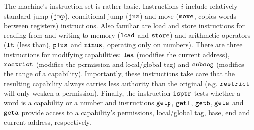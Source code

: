 \documentclass[format=acmsmall, review=true, screen=true]{acmart}
\newcommand{\zinstr}[1]{\mathtt{#1}}
\newcommand{\oneinstr}[2]{
  \ifthenelse{\equal{#2}{}}
  {\zinstr{#1}}
  {\zinstr{#1} \; #2}
}
\newcommand{\jmp}[1]{\oneinstr{jmp}{#1}}
\newcommand{\twoinstr}[3]{
  \ifthenelse{\equal{#2#3}{}}
  {\zinstr{#1}}
  {\zinstr{#1} \; #2 \; #3}
}
\newcommand{\restricttwo}[2]{\twoinstr{restrict}{#1}{#2}}
\newcommand{\jnz}[2]{\twoinstr{jnz}{#1}{#2}}
\newcommand{\isptr}[2]{\twoinstr{isptr}{#1}{#2}}
\newcommand{\geta}[2]{\twoinstr{geta}{#1}{#2}}
\newcommand{\getb}[2]{\twoinstr{getb}{#1}{#2}}
\newcommand{\gete}[2]{\twoinstr{gete}{#1}{#2}}
\newcommand{\getp}[2]{\twoinstr{getp}{#1}{#2}}
\newcommand{\getl}[2]{\twoinstr{getl}{#1}{#2}}
\newcommand{\move}[2]{\twoinstr{move}{#1}{#2}}
\newcommand{\store}[2]{\twoinstr{store}{#1}{#2}}
\newcommand{\load}[2]{\twoinstr{load}{#1}{#2}}
\newcommand{\lea}[2]{\twoinstr{lea}{#1}{#2}}
\newcommand{\threeinstr}[4]{
  \ifthenelse{\equal{#2#3#4}{}}
  {\zinstr{#1}}
  {\zinstr{#1} \; #2 \; #3 \; #4}
}
\newcommand{\subseg}[3]{\threeinstr{subseg}{#1}{#2}{#3}}
\newcommand{\plus}[3]{\threeinstr{plus}{#1}{#2}{#3}}
\newcommand{\minus}[3]{\threeinstr{minus}{#1}{#2}{#3}}
\newcommand{\lt}[3]{\threeinstr{lt}{#1}{#2}{#3}}
\begin{document}
The machine's instruction set is rather basic. Instructions $i$ include
relatively standard jump ($\jmp{}$), conditional jump ($\jnz{}{}$) and move
($\move{}{}$, copies words between registers) instructions. Also familiar are
load and store instructions for reading from and writing to memory ($\load{}{}$
and $\store{}{}$) and arithmetic operators ($\lt{}{}{}$ (less than), $\plus{}{}{}$ and
$\minus{}{}{}$, operating only on numbers). There are three instructions for
modifying capabilities: $\lea{}{}$ (modifies the current address),
$\restricttwo{}{}$ (modifies the permission and local/global tag) and
$\subseg{}{}{}$ (modifies the range of a capability). Importantly, these
instructions take care that the resulting capability always carries less
authority than the original (e.g. $\restricttwo{}{}$ will only weaken a permission).
Finally, the instruction $\isptr{}{}$ tests whether a word is a capability or a
number and instructions $\getp{}{}$, $\getl{}{}$, $\getb{}{}$, $\gete{}{}$ and
$\geta{}{}$ provide access to a capability's permissions, local/global tag, base,
end and current address, respectively.
\end{document}
